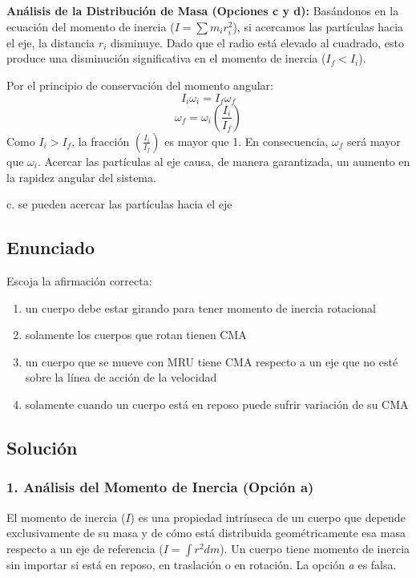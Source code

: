 \documentclass[12pt, a4paper]{article}
\begin{document}
\textbf{Análisis de la Distribución de Masa (Opciones c y d):}
Basándonos en la ecuación del momento de inercia ($I = \sum m_i r_i^2$), si acercamos las partículas hacia el eje, la distancia $r_i$ disminuye. Dado que el radio está elevado al cuadrado, esto produce una disminución significativa en el momento de inercia ($I_f < I_i$).

Por el principio de conservación del momento angular:
$$I_i \omega_i = I_f \omega_f$$
$$\omega_f = \omega_i \left( \frac{I_i}{I_f} \right)$$
Como $I_i > I_f$, la fracción $\left( \frac{I_i}{I_f} \right)$ es mayor que 1. En consecuencia, $\omega_f$ será mayor que $\omega_i$. Acercar las partículas al eje causa, de manera garantizada, un aumento en la rapidez angular del sistema.

\begin{tcolorbox}[colback=green!5!white, colframe=green!50!black, title=Respuesta Correcta]
\centering \Large c. se pueden acercar las partículas hacia el eje
\end{tcolorbox}

\newpage

\subsection*{Enunciado}
Escoja la afirmación correcta:
\begin{enumerate}[label=\alph*.]
    \item un cuerpo debe estar girando para tener momento de inercia rotacional
    \item solamente los cuerpos que rotan tienen CMA
    \item un cuerpo que se mueve con MRU tiene CMA respecto a un eje que no esté sobre la línea de acción de la velocidad
    \item solamente cuando un cuerpo está en reposo puede sufrir variación de su CMA
\end{enumerate}

\subsection*{Solución}

\subsubsection*{1. Análisis del Momento de Inercia (Opción a)}
El momento de inercia ($I$) es una propiedad intrínseca de un cuerpo que depende exclusivamente de su masa y de cómo está distribuida geométricamente esa masa respecto a un eje de referencia ($I = \int r^2 dm$). Un cuerpo tiene momento de inercia sin importar si está en reposo, en traslación o en rotación. La opción \textit{a} es falsa.
\end{document}
